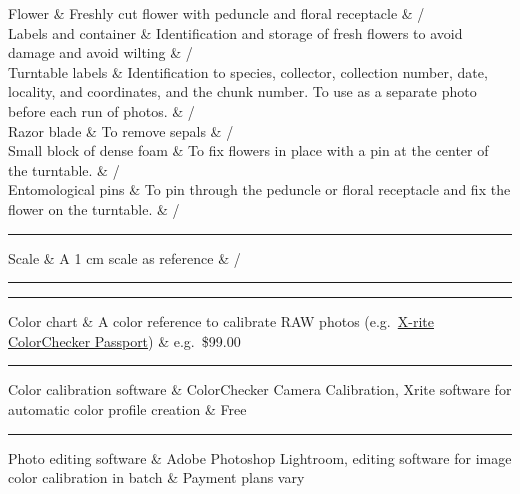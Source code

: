 \documentclass[
]{book}
\begin{document}
\hfill\break
Flower \& Freshly cut flower with peduncle and floral receptacle \& /\\
Labels and container \& Identification and storage of fresh flowers to
avoid damage and avoid wilting \& /\\
Turntable labels \& Identification to species, collector, collection
number, date, locality, and coordinates, and the chunk number. To use as
a separate photo before each run of photos. \& /\\
Razor blade \& To remove sepals \& /\\
Small block of dense foam \& To fix flowers in place with a pin at the
center of the turntable. \& /\\
Entomological pins \& To pin through the peduncle or floral receptacle
and fix the flower on the turntable. \& /\\

\begin{center}\rule{0.5\linewidth}{0.5pt}\end{center}

Scale \& A 1 cm scale as reference \& /\\

\begin{center}\rule{0.5\linewidth}{0.5pt}\end{center}

\hfill\break

\begin{center}\rule{0.5\linewidth}{0.5pt}\end{center}

Color chart \& A color reference to calibrate RAW photos (e.g.~\href{https://www.xrite.com/categories/calibration-profiling/colorchecker-targets/colorchecker-passport-photo-2}{X-rite
ColorChecker
Passport})
\& e.g.~\$99.00\\

\begin{center}\rule{0.5\linewidth}{0.5pt}\end{center}

Color calibration software \& ColorChecker Camera Calibration, Xrite
software for automatic color profile creation \& Free\\

\begin{center}\rule{0.5\linewidth}{0.5pt}\end{center}

Photo editing software \& Adobe Photoshop Lightroom, editing software for
image color calibration in batch \& Payment plans vary\\
\end{document}
